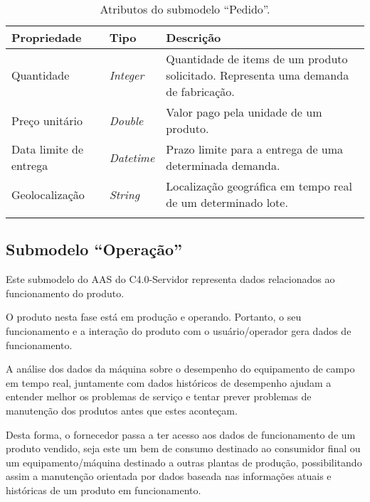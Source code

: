 \begin{longtable}{p{} p{} p{}}
	\caption{Atributos do submodelo ``Pedido''.}                                           \\
	\hline
	\textbf{Propriedade}
	 & \textbf{Tipo}
	 & \textbf{Descrição}                                                                  \\

	\hline
	Quantidade
	 & \textit{Integer}
	 & Quantidade de items de um produto solicitado. Representa uma demanda de fabricação. \\

	\hline
	Preço unitário
	 & \textit{Double}
	 & Valor pago pela unidade de um produto.                                              \\

	\hline
	Data limite de entrega
	 & \textit{Datetime}
	 & Prazo limite para a entrega de uma determinada demanda.                             \\

	\hline
	Geolocalização
	 & \textit{String}
	 & Localização geográfica em tempo real de um determinado lote.                        \\

	\hline
	\label{tab:submodelo-pedido}
\end{longtable}


\subsection{Submodelo ``Operação''}

Este submodelo do AAS do C4.0-Servidor representa dados relacionados ao funcionamento do produto.

O produto nesta fase está em produção e operando. Portanto, o seu funcionamento e a interação do produto com o usuário/operador gera dados de funcionamento.

A análise dos dados da máquina sobre o desempenho do equipamento de campo em tempo real, juntamente com dados históricos de desempenho ajudam a entender melhor os problemas de serviço e tentar prever problemas de manutenção dos produtos antes que estes aconteçam.

Desta forma, o fornecedor passa a ter acesso aos dados de funcionamento de um produto vendido, seja este um bem de consumo destinado ao consumidor final ou um equipamento/máquina destinado a outras plantas de produção, possibilitando assim a manutenção orientada por dados baseada nas informações atuais e históricas de um produto em funcionamento.

